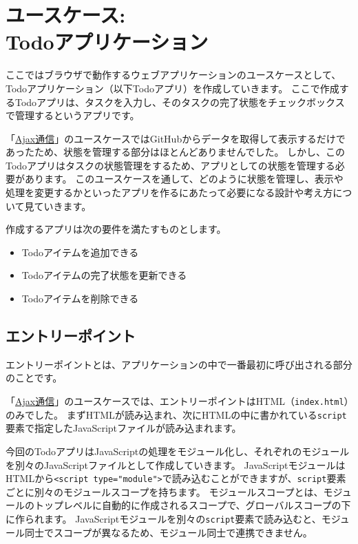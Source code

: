 \hypertarget{todo-app}{%
\chapter[ユースケース: Todoアプリケーション]{ユースケース: \\Todoアプリケーション}\label{todo-app}}
\thispagestyle{frontheadings}

ここではブラウザで動作するウェブアプリケーションのユースケースとして、Todoアプリケーション（以下Todoアプリ）を作成していきます。
ここで作成するTodoアプリは、タスクを入力し、そのタスクの完了状態をチェックボックスで管理するというアプリです。

「\hyperlink{usecase-ajax}{Ajax通信}」のユースケースではGitHubからデータを取得して表示するだけであったため、状態を管理する部分はほとんどありませんでした。
しかし、このTodoアプリはタスクの状態管理をするため、アプリとしての状態を管理する必要があります。
このユースケースを通して、どのように状態を管理し、表示や処理を変更するかといったアプリを作るにあたって必要になる設計や考え方について見ていきます。

作成するアプリは次の要件を満たすものとします。

\begin{itemize}
\item
  Todoアイテムを追加できる
\item
  Todoアイテムの完了状態を更新できる
\item
  Todoアイテムを削除できる
\end{itemize}

\hypertarget{entrypoint_todo}{%
\section{エントリーポイント}\label{entrypoint}}

エントリーポイントとは、アプリケーションの中で一番最初に呼び出される部分のことです。

「\hyperlink{usecase-ajax}{Ajax通信}」のユースケースでは、エントリーポイントはHTML（\texttt{index.html}）のみでした。
まずHTMLが読み込まれ、次にHTMLの中に書かれている\texttt{script}要素で指定したJavaScriptファイルが読み込まれます。

今回のTodoアプリはJavaScriptの処理をモジュール化し、それぞれのモジュールを別々のJavaScriptファイルとして作成していきます。
JavaScriptモジュールはHTMLから\texttt{<script type="module">}で読み込むことができますが、\texttt{script}要素ごとに別々のモジュールスコープを持ちます。
モジュールスコープとは、モジュールのトップレベルに自動的に作成されるスコープで、グローバルスコープの下に作られます。
JavaScriptモジュールを別々の\texttt{script}要素で読み込むと、モジュール同士でスコープが異なるため、モジュール同士で連携できません。

